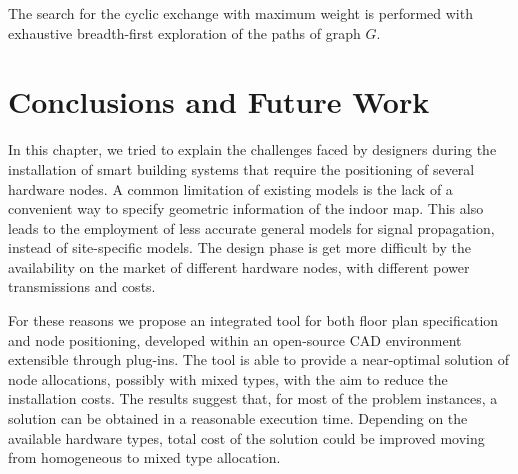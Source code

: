 The search for the cyclic exchange with maximum weight is performed with exhaustive breadth-first exploration of the paths of graph $G$.





\section{Conclusions and Future Work}
In this chapter, we tried to explain the challenges faced by designers during the installation of smart building systems that require the positioning of several hardware nodes. A common limitation of existing models is the lack of a convenient way to specify geometric information of the indoor map. This also leads to the employment of less accurate general models for signal propagation, instead of site-specific models. The design phase is get more difficult by the availability on the market of different hardware nodes, with different power transmissions and costs.

For these reasons we propose an integrated tool for both floor plan specification and node positioning, developed within an \mbox{open-source} CAD environment extensible through plug-ins. The tool is able to provide a near-optimal solution of node allocations, possibly with mixed types, with the aim to reduce the installation costs. The results suggest that, for most of the problem instances, a solution can be obtained in a reasonable execution time. Depending on the available hardware types, total cost of the solution could be improved moving from homogeneous to mixed type allocation.

